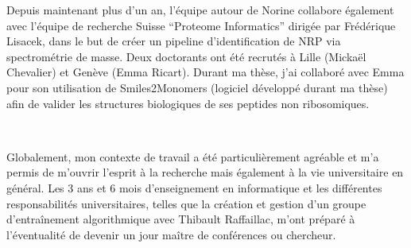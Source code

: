 Depuis maintenant plus d'un an, l'équipe autour de Norine collabore également avec l'équipe de recherche Suisse ``Proteome Informatics'' dirigée par Frédérique Lisacek, dans le but de créer un pipeline d'identification de NRP via spectrométrie de masse.
Deux doctorants ont été recrutés à Lille (Mickaël Chevalier) et Genève (Emma Ricart).
Durant ma thèse, j'ai collaboré avec Emma pour son utilisation de Smiles2Monomers (logiciel développé durant ma thèse) afin de valider les structures biologiques de ses peptides non ribosomiques.

~~

Globalement, mon contexte de travail a été particulièrement agréable et m'a permis de m'ouvrir l'esprit à la recherche mais également à la vie universitaire en général.
Les 3 ans et 6 mois d'enseignement en informatique et les différentes responsabilités universitaires, telles que la création et gestion d'un groupe d’entraînement algorithmique avec Thibault Raffaillac, m'ont préparé à l'éventualité de devenir un jour maître de conférences ou chercheur.




























